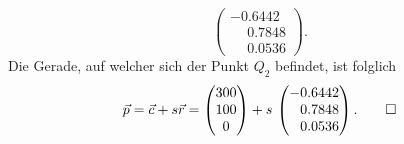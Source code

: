 \begin{loesung}
\begin{teilaufgaben}
\[\begin{pmatrix}
  -0.6442\\
  \phantom{-}0.7848\\
  \phantom{-}0.0536
\end{pmatrix}.
\]
Die Gerade, auf welcher sich der Punkt $Q_2$ befindet, ist folglich
\[
\vec p = \vec c + s\vec r = 
\begin{pmatrix}
300\\
100\\
0
\end{pmatrix} + s\,
\begin{pmatrix}
-0.6442\\
\phantom{-}0.7848\\
\phantom{-}0.0536
\end{pmatrix}.
\qedhere
\]
\end{teilaufgaben}
\end{loesung}
